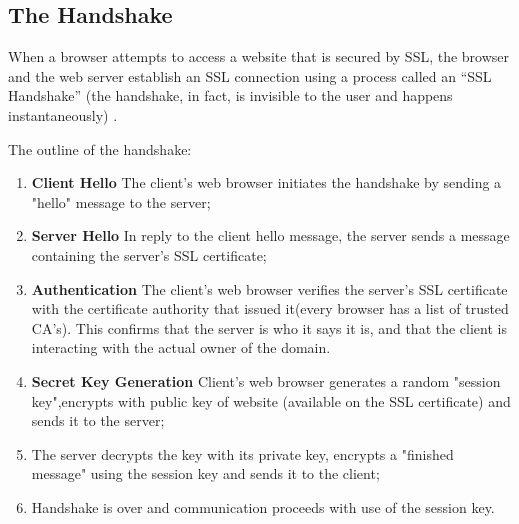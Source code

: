 \subsection{The Handshake} 

When a browser attempts to access a website that is secured by SSL, the browser and the web server establish an SSL connection using a process called an “SSL Handshake” (the handshake, in fact, is invisible to the user and happens instantaneously) \cite{digicert, cloudflare_handshake}.

The outline of the handshake:

\begin{enumerate}
\item \textbf{Client Hello} The client's web browser initiates the handshake by sending a "hello" message to the server;
\item \textbf{Server Hello} In reply to the client hello message, the server sends a message containing the server's SSL certificate;
\item \textbf{Authentication} The client's web browser verifies the server's SSL certificate with the certificate authority that issued it(every browser has a list of trusted CA's). This confirms that the server is who it says it is, and that the client is interacting with the actual owner of the domain.
\item \textbf{Secret Key Generation} Client's web browser generates a random "session key",encrypts with public key of website (available on the SSL certificate) and sends it to the server;
\item The server decrypts the key with its private key, encrypts a "finished message" using the session key and sends it to the client;
\item Handshake is over and communication proceeds with use of the session key.
\end{enumerate}
